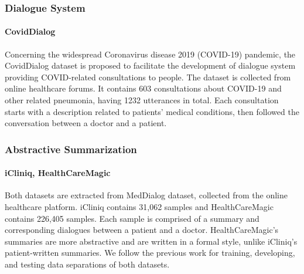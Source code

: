 \documentclass[11pt]{article}
\begin{document}
\begin{table}[h]
\small 
\centering
{}
\caption{The main result on NER tasks.}
\label{tab:ner}
\small 
\end{table} 


\subsubsection{Dialogue System}
\paragraph{CovidDialog} \cite{ju2020CovidDialog} Concerning the widespread Coronavirus disease 2019 (COVID-19) pandemic, the CovidDialog dataset is proposed to facilitate the development of dialogue system providing COVID-related consultations to people. The dataset is collected from online healthcare forums.
It contains 603 consultations about COVID-19 and other related pneumonia, having 1232 utterances in total. Each consultation starts with a description related to patients' medical conditions, then followed the conversation between a doctor and a patient. 

\subsubsection{Abstractive Summarization}
\paragraph{iCliniq, HealthCareMagic} Both datasets are extracted from MedDialog \cite{zeng-etal-2020-meddialog} dataset, collected from the online healthcare platform. iCliniq contains 31,062 samples and HealthCareMagic contains 226,405 samples. Each sample is comprised of a summary and corresponding dialogues between a patient and a doctor. HealthCareMagic’s summaries are more abstractive and are written in a formal style, unlike iCliniq’s patient-written summaries.
We follow the previous work \cite{mrini-etal-2021-gradually} for training, developing, and testing data separations of both datasets.
\end{document}
